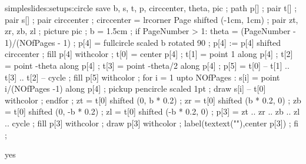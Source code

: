 \startsetups simpleslides:setups:circle
save b, s, t, p, circcenter, theta, pic ;
path p[] ;
pair t[] ;
pair s[] ;
pair circcenter ; circcenter = lrcorner Page shifted (-1cm, 1cm) ;
pair zt, zr, zb, zl ;
picture pic ;
b = 1.5cm ;
if PageNumber > 1:
	theta = (PageNumber - 1)/(NOfPages - 1) ;
 	p[4] = fullcircle scaled b rotated 90 ;
	p[4] := p[4] shifted circcenter ;
 	fill p[4] withcolor  ;
 	t[0] = center p[4] ;
 	t[1] = point 1 along p[4] ;
 	t[2] = point -theta along p[4] ;
 	t[3] = point -theta/2 along p[4] ;
 	p[5] = t[0] -- t[1] .. t[3] .. t[2] -- cycle ;
 	fill p[5] withcolor  ;
 	for i = 1 upto NOfPages :
 		s[i] = point i/(NOfPages -1) along p[4] ;
 		pickup pencircle scaled 1pt ;
 		draw s[i] -- t[0] withcolor  ;
 	endfor ;
 	zt = t[0] shifted (0, b * 0.2) ;
	zr = t[0] shifted (b * 0.2, 0) ;
	zb = t[0] shifted (0, -b * 0.2) ;
	zl = t[0] shifted (-b * 0.2, 0) ;
	p[3] = zt .. zr .. zb .. zl .. cycle ;
 	fill p[3] withcolor   ;
 	draw p[3] withcolor  ;
 	label(textext("\switchtobodyfont[10pt]\pagenumber"),center p[3]) ;
fi ;
\stopuseMPgraphic 
\stopsetups

    {}
    {}

\doif%
  {}
  {yes}
  {}


\setuplayout [width=fit,
              margin=0cm,
              height=fit,
              header=3cm, 
              footer=0.8cm, 
              topspace=.6cm, 
              backspace=1cm,
              location=singlesided]




\setupcombinations[distance=1.85cm]

